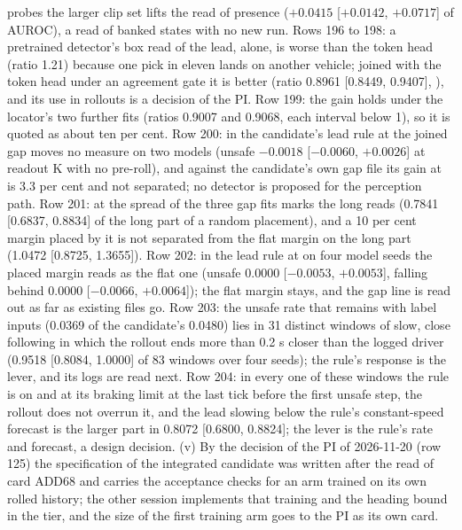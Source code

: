 probes the larger clip set lifts the read of presence ($+0.0415$ [$+0.0142$, $+0.0717$] of AUROC), a read of banked states with no new run. Rows 196 to 198: a pretrained detector's box read of the lead, alone, is worse than the token head (ratio 1.21) because one pick in eleven lands on another vehicle; joined with the token head under an agreement gate it is better (ratio 0.8961 [0.8449, 0.9407], ), and its use in rollouts is a decision of the PI. Row 199: the gain holds under the locator's two further fits (ratios 0.9007 and 0.9068, each interval below 1), so it is quoted as about ten per cent. Row 200: in the candidate's lead rule at  the joined gap moves no measure on two models (unsafe $-0.0018$ [$-0.0060$, $+0.0026$] at readout K with no pre-roll), and against the candidate's own gap file its gain at  is 3.3 per cent and not separated; no detector is proposed for the perception path. Row 201: at  the spread of the three gap fits marks the long reads (0.7841 [0.6837, 0.8834] of the long part of a random placement), and a 10 per cent margin placed by it is not separated from the flat margin on the long part (1.0472 [0.8725, 1.3655]). Row 202: in the lead rule at  on four model seeds the placed margin reads as the flat one (unsafe 0.0000 [$-0.0053$, $+0.0053$], falling behind 0.0000 [$-0.0066$, $+0.0064$]); the flat margin stays, and the gap line is read out as far as existing files go. Row 203: the unsafe rate that remains with label inputs (0.0369 of the candidate's 0.0480) lies in 31 distinct windows of slow, close following in which the rollout ends more than 0.2 s closer than the logged driver (0.9518 [0.8084, 1.0000] of 83 windows over four seeds); the rule's response is the lever, and its logs are read next. Row 204: in every one of these windows the rule is on and at its braking limit at the last tick before the first unsafe step, the rollout does not overrun it, and the lead slowing below the rule's constant-speed forecast is the larger part in 0.8072 [0.6800, 0.8824]; the lever is the rule's rate and forecast, a design decision. (v) By the decision of the PI of 2026-11-20 (row 125) the specification of the integrated candidate was written after the read of card ADD68 and carries the acceptance checks for an arm trained on its own rolled history; the other session implements that training and the heading bound in the tier, and the size of the first training arm goes to the PI as its own card.
